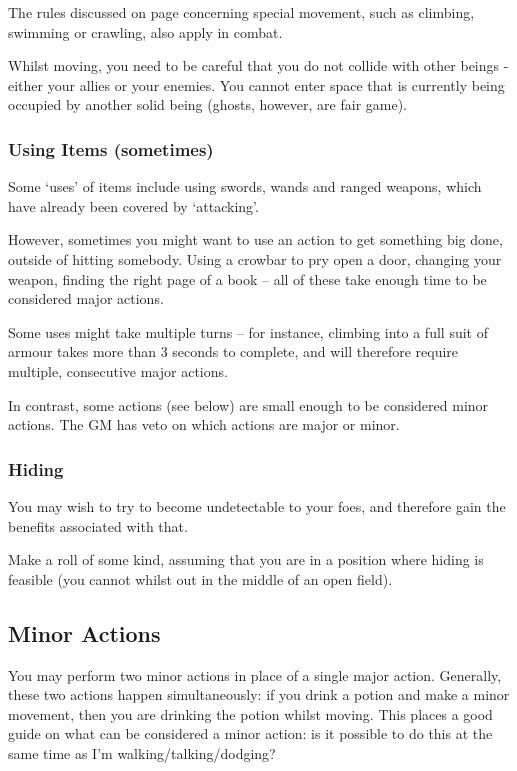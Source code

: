The rules discussed on page \pageref{S:SpecialMovement} concerning special movement, such as climbing, swimming or crawling, also apply in combat. 

Whilst moving, you need to be careful that you do not collide with other beings - either your allies or your enemies. You cannot enter space that is currently being occupied by another solid being (ghosts, however, are fair game). 

 \subsubsection{Using Items (sometimes)}
 
Some `uses' of items include using swords, wands and ranged weapons, which have already been covered by `attacking'. 

However, sometimes you might want to use an action to get something big done, outside of hitting somebody. Using a crowbar to pry open a door, changing your weapon, finding the right page of a book -- all of these take enough time to be considered major actions. 

Some uses might take multiple turns -- for instance, climbing into a full suit of armour takes more than 3 seconds to complete, and will therefore require multiple, consecutive major actions. 

In contrast, some actions (see below) are small enough to be considered minor actions. The GM has veto on which actions are major or minor. 

\subsubsection{Hiding}

You may wish to try to become undetectable to your foes, and therefore gain the benefits associated with that. 

Make a  roll of some kind, assuming that you are in a position where hiding is feasible (you cannot  whilst out in the middle of an open field). 

\subsection{Minor Actions}
You may perform two minor actions in place of a single major action. Generally, these two actions happen simultaneously: if you drink a potion and make a minor movement, then you are drinking the potion whilst moving. This places a good guide on what can be considered a minor action: is it possible to do this at the same time as I'm walking/talking/dodging? 

